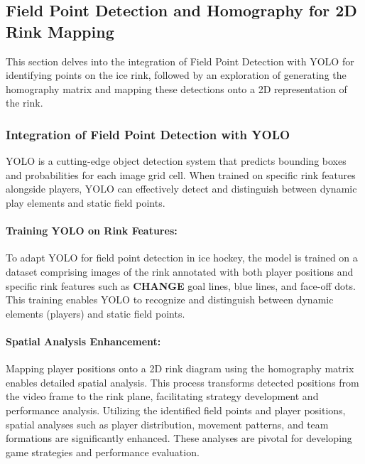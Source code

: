 \documentclass[12pt, letterpaper]{article}
\begin{document}
{
\setlength{\parskip}{0.3cm}
\subsection{Field Point Detection and Homography for 2D Rink Mapping}
\begin{spacing}{1.2}
This section delves into the integration of Field Point Detection with YOLO for identifying points on the ice rink, followed by an exploration of generating the homography matrix and mapping these detections onto a 2D representation of the rink.


\subsubsection{Integration of Field Point Detection with YOLO}
YOLO is a cutting-edge object detection system that predicts bounding boxes and probabilities for each image grid cell. When trained on specific rink features alongside players, YOLO can effectively detect and distinguish between dynamic play elements and static field points.

\paragraph{Training YOLO on Rink Features:}
To adapt YOLO for field point detection in ice hockey, the model is trained on a dataset comprising images of the rink annotated with both player positions and specific rink features such as \textbf{CHANGE} goal lines, blue lines, and face-off dots. This training enables YOLO to recognize and distinguish between dynamic elements (players) and static field points.



\paragraph{Spatial Analysis Enhancement:}
Mapping player positions onto a 2D rink diagram using the homography matrix enables detailed spatial analysis. This process transforms detected positions from the video frame to the rink plane, facilitating strategy development and performance analysis. Utilizing the identified field points and player positions, spatial analyses such as player distribution, movement patterns, and team formations are significantly enhanced. These analyses are pivotal for developing game strategies and performance evaluation.



\end{spacing}}
\end{document}
